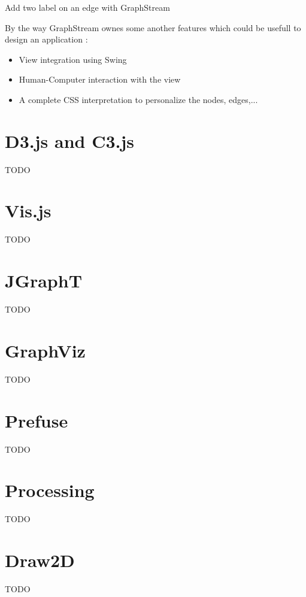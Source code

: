 \begin{listing}[h] %
    \centering
    \caption{Add two label on an edge with GraphStream}
    \label{lst:graphstream-edge-sprite}
\end{listing} %


By the way GraphStream ownes some another features which could be usefull to design an application :
\begin{itemize}
    \item View integration using Swing
    \item Human-Computer interaction with the view
    \item A complete CSS interpretation to personalize the nodes, edges,...
\end{itemize}


\section{D3.js and C3.js} %
\label{sec:D3.js and C3.js}

TODO



\section{Vis.js} %
\label{sec:Vis.js}

TODO



\section{JGraphT} %
\label{sec:JGraphT}

TODO



\section{GraphViz} %
\label{sec:GraphViz}

TODO



\section{Prefuse} %
\label{sec:Prefuse}

TODO



\section{Processing} %
\label{sec:Processing}

TODO


\section{Draw2D} %
\label{sec:Draw2D}

TODO




